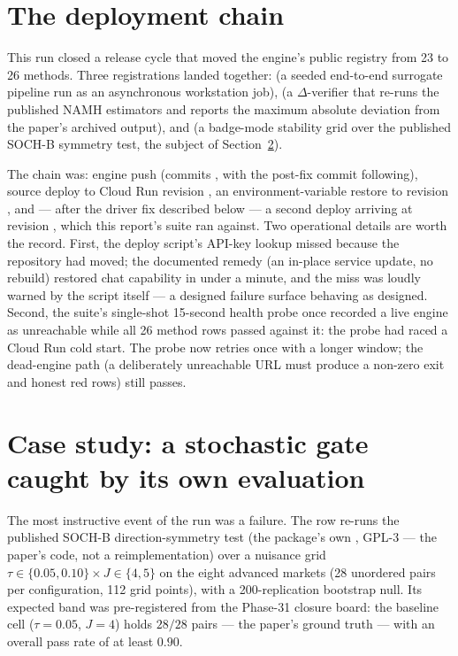 
\section{The deployment chain}
This run closed a release cycle that moved the engine's public registry from
23 to 26 methods. Three registrations landed together: 
(a seeded end-to-end surrogate pipeline run as an asynchronous workstation
job),  (a $\Delta$-verifier that re-runs the published
NAMH estimators and reports the maximum absolute deviation from the paper's
archived output), and  (a badge-mode stability grid
over the published SOCH-B symmetry test, the subject of
Section~\ref{sec:case}).

The chain was: engine push (commits , with the
post-fix commit  following), source deploy to Cloud Run
revision , an environment-variable restore to
revision , and --- after the driver fix described below --- a
second deploy arriving at revision , which this
report's suite ran against. Two operational details are worth the record.
First, the deploy script's API-key lookup missed because the repository had
moved; the documented remedy (an in-place service update, no rebuild)
restored chat capability in under a minute, and the miss was loudly warned by
the script itself --- a designed failure surface behaving as designed.
Second, the suite's single-shot 15-second health probe once recorded a live
engine as unreachable while all 26 method rows passed against it: the probe
had raced a Cloud Run cold start. The probe now retries once with a longer
window; the dead-engine path (a deliberately unreachable URL must produce a
non-zero exit and honest red rows) still passes.

\section{Case study: a stochastic gate caught by its own evaluation}
\label{sec:case}
The most instructive event of the run was a failure. The
 row re-runs the published SOCH-B direction-symmetry
test (the  package's own ,
GPL-3 --- the paper's code, not a reimplementation) over a nuisance grid
$\tau \in \{0.05, 0.10\} \times J \in \{4, 5\}$ on the eight advanced markets
(28 unordered pairs per configuration, 112 grid points), with a
200-replication bootstrap null. Its expected band was pre-registered from the
Phase-31 closure board: the baseline cell ($\tau=0.05$, $J=4$) holds
$28/28$ pairs --- the paper's ground truth --- with an overall pass rate of
at least $0.90$.

